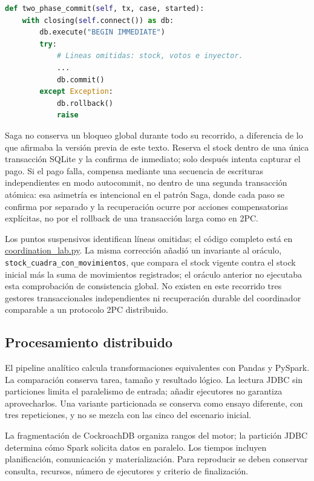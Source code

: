 \documentclass[12pt,a4paper]{article}
\newcommand{\evidencia}[2]{\href{https://github.com/JoseLozanoMorales/TiendaTech/blob/c5dca588ea9662cab56732c97fe644b9a929854b/#1}{#2}}
\begin{document}
\begin{minipage}{\linewidth}
\begin{lstlisting}[language=Python,caption={Extracto de E-2PC local: control de escritura delegado en SQLite, sin bloqueo de Python.},label={lst:lab}]
def two_phase_commit(self, tx, case, started):
    with closing(self.connect()) as db:
        db.execute("BEGIN IMMEDIATE")
        try:
            # Lineas omitidas: stock, votos e inyector.
            ...
            db.commit()
        except Exception:
            db.rollback()
            raise
\end{lstlisting}
\end{minipage}
Saga no conserva un bloqueo global durante todo su recorrido, a diferencia de lo que afirmaba la versión previa de este texto. Reserva el stock dentro de una única transacción SQLite y la confirma de inmediato; solo después intenta capturar el pago. Si el pago falla, compensa mediante una secuencia de escrituras independientes en modo autocommit, no dentro de una segunda transacción atómica: esa asimetría es intencional en el patrón Saga, donde cada paso se confirma por separado y la recuperación ocurre por acciones compensatorias explícitas, no por el rollback de una transacción larga como en 2PC.

Los puntos suspensivos identifican líneas omitidas; el código completo está en \evidencia{experiments/paso7/coordination_lab.py}{coordination\_lab.py}. La misma corrección añadió un invariante al oráculo, \texttt{stock\_cuadra\_con\_movimientos}, que compara el stock vigente contra el stock inicial más la suma de movimientos registrados; el oráculo anterior no ejecutaba esta comprobación de consistencia global. No existen en este recorrido tres gestores transaccionales independientes ni recuperación durable del coordinador comparable a un protocolo 2PC distribuido.

\subsection{Procesamiento distribuido}
El pipeline analítico calcula transformaciones equivalentes con Pandas y PySpark. La comparación conserva tarea, tamaño y resultado lógico. La lectura JDBC sin particiones limita el paralelismo de entrada; añadir ejecutores no garantiza aprovecharlos. Una variante particionada se conserva como ensayo diferente, con tres repeticiones, y no se mezcla con las cinco del escenario inicial.

La fragmentación de CockroachDB organiza rangos del motor; la partición JDBC determina cómo Spark solicita datos en paralelo. Los tiempos incluyen planificación, comunicación y materialización. Para reproducir se deben conservar consulta, recursos, número de ejecutores y criterio de finalización.
\end{document}
